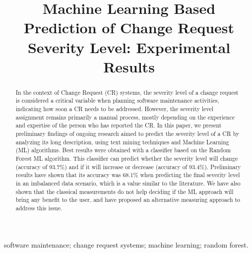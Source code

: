 \documentclass[10pt, conference]{IEEEtran}
\begin{document}
\title{Machine Learning Based Prediction of Change Request Severity Level: Experimental Results}

\author{
\and
{}
}

\maketitle

\begin{abstract}
In the context of Change Request (CR) systems, the severity level of a change request is considered a critical variable when planning software maintenance activities, indicating how soon a CR needs to be addressed. However, the severity level assignment remains primarily a manual process, mostly depending on the experience and expertise of the person who has reported the CR. In this paper, we present preliminary findings of ongoing research aimed to predict the severity level of a CR by analyzing its long description, using text mining techniques and Machine Learning (ML) algorithms. Best results were obtained with a classifier based on the Random Forest ML algorithm. This classifier can predict whether the severity level will change (accuracy of 93.7\%) and if it will increase or decrease (accuracy of 93.4\%). Preliminary results have shown that its accuracy was 68.1\% when predicting the final severity level in an imbalanced data scenario, which is a value similar to the literature. We have also shown that the classical measurements do not help deciding if the ML approach will bring any benefit to the user, and have proposed an alternative measuring approach to address this issue.

\end{abstract}

\begin{IEEEkeywords}
software maintenance; change request systems; machine learning; random forest.
\end{IEEEkeywords}


%
\IEEEpeerreviewmaketitle
\end{document}
